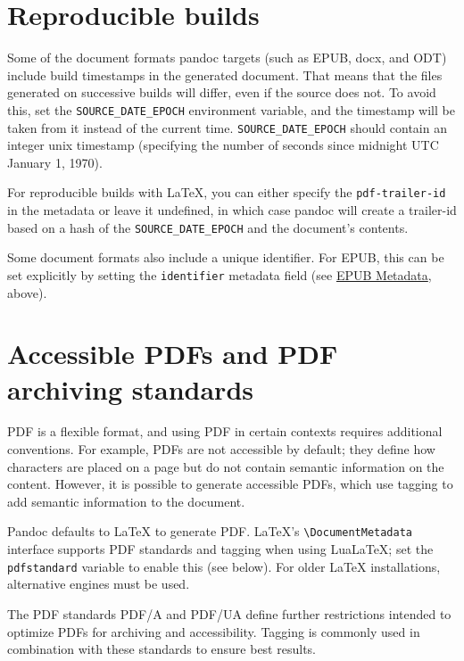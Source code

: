 \documentclass[
]{article}
\begin{document}
\hypertarget{reproducible-builds}{%
\section{Reproducible builds}\label{reproducible-builds}}

Some of the document formats pandoc targets (such as EPUB, docx, and
ODT) include build timestamps in the generated document. That means that
the files generated on successive builds will differ, even if the source
does not. To avoid this, set the \texttt{SOURCE\_DATE\_EPOCH}
environment variable, and the timestamp will be taken from it instead of
the current time. \texttt{SOURCE\_DATE\_EPOCH} should contain an integer
unix timestamp (specifying the number of seconds since midnight UTC
January 1, 1970).

For reproducible builds with LaTeX, you can either specify the
\texttt{pdf-trailer-id} in the metadata or leave it undefined, in which
case pandoc will create a trailer-id based on a hash of the
\texttt{SOURCE\_DATE\_EPOCH} and the document's contents.

Some document formats also include a unique identifier. For EPUB, this
can be set explicitly by setting the \texttt{identifier} metadata field
(see \protect\hyperlink{epub-metadata}{EPUB Metadata}, above).

\hypertarget{accessible-pdfs-and-pdf-archiving-standards}{%
\section{Accessible PDFs and PDF archiving
standards}\label{accessible-pdfs-and-pdf-archiving-standards}}

PDF is a flexible format, and using PDF in certain contexts requires
additional conventions. For example, PDFs are not accessible by default;
they define how characters are placed on a page but do not contain
semantic information on the content. However, it is possible to generate
accessible PDFs, which use tagging to add semantic information to the
document.

Pandoc defaults to LaTeX to generate PDF. LaTeX's
\texttt{\textbackslash{}DocumentMetadata} interface supports PDF
standards and tagging when using LuaLaTeX; set the \texttt{pdfstandard}
variable to enable this (see below). For older LaTeX installations,
alternative engines must be used.

The PDF standards PDF/A and PDF/UA define further restrictions intended
to optimize PDFs for archiving and accessibility. Tagging is commonly
used in combination with these standards to ensure best results.
\end{document}
